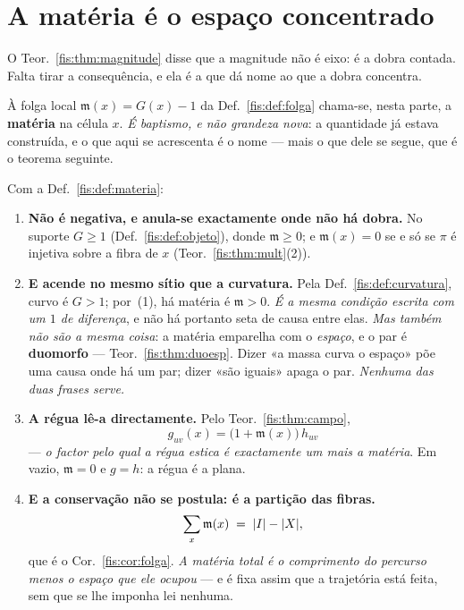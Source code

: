 \documentclass[livro.tex]{subfiles}
\begin{document}
\section{A matéria é o espaço concentrado}\label{fis:grav-materia}

\noindent O Teor.~\ref{fis:thm:magnitude} disse que a magnitude não é eixo: é a
dobra contada. Falta tirar a consequência, e ela é a que dá nome ao que a dobra
concentra.

\begin{definicao}\label{fis:def:materia}
À folga local $\mathfrak{m}(x)=G(x)-1$ da Def.~\ref{fis:def:folga} chama-se, nesta
parte, a \textbf{matéria} na célula $x$. \emph{É baptismo, e não grandeza nova}:
a quantidade já estava construída, e o que aqui se acrescenta é o nome --- mais o
que dele se segue, que é o teorema seguinte.
\end{definicao}

\begin{teorema}\label{fis:thm:materia}
Com a Def.~\ref{fis:def:materia}:
\begin{enumerate}\itemsep3pt
\item[(1)] \textbf{Não é negativa, e anula-se exactamente onde não há dobra.} No
suporte $G\ge1$ (Def.~\ref{fis:def:objeto}), donde $\mathfrak{m}\ge0$; e
$\mathfrak{m}(x)=0$ se e só se $\pi$ é injetiva sobre a fibra de $x$
(Teor.~\ref{fis:thm:mult}(2)).
\item[(2)] \textbf{E acende no mesmo sítio que a curvatura.} Pela
Def.~\ref{fis:def:curvatura}, curvo é $G>1$; por~(1), há matéria é
$\mathfrak{m}>0$. \emph{É a mesma condição escrita com um $1$ de diferença}, e
não há portanto seta de causa entre elas. \emph{Mas também não são a mesma
coisa}: a matéria emparelha com o \emph{espaço}, e o par é \textbf{duomorfo} ---
Teor.~\ref{fis:thm:duoesp}. Dizer «a massa curva o espaço» põe uma causa onde há
um par; dizer «são iguais» apaga o par. \emph{Nenhuma das duas frases serve.}
\item[(3)] \textbf{A régua lê-a directamente.} Pelo Teor.~\ref{fis:thm:campo},
\[
\boxed{\;g_{uv}(x)=\bigl(1+\mathfrak{m}(x)\bigr)\,h_{uv}\;}
\]
--- \emph{o factor pelo qual a régua estica é exactamente um mais a matéria}. Em
vazio, $\mathfrak{m}=0$ e $g=h$: a régua é a plana.
\item[(4)] \textbf{E a conservação não se postula: é a partição das fibras.}
\[
\sum_{x}\mathfrak{m}(x)\;=\;\lvert I\rvert-\lvert X\rvert ,
\]
que é o Cor.~\ref{fis:cor:folga}. \emph{A matéria total é o comprimento do
percurso menos o espaço que ele ocupou} --- e é fixa assim que a trajetória
está feita, sem que se lhe imponha lei nenhuma.
\end{enumerate}
\end{teorema}
\end{document}
